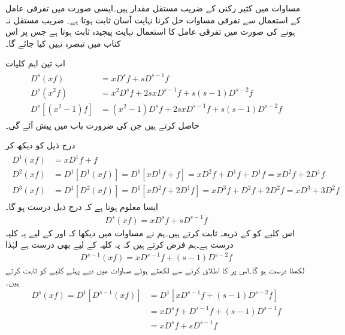 مساوات  میں کثیر رکنی کے  ضریب  مستقل مقدار ہیں۔ایسی صورت میں تفرقی عامل کے استعمال سے تفرقی مساوات حل کرنا نہایت آسان ثابت ہوتا ہے۔ ضریب  مستقل نہ ہونے کی صورت میں تفرقی عامل کا استعمال نہایت پیچیدہ ثابت ہوتا ہے جس پر اس کتاب میں تبصرہ نہیں کیا جائے گا۔


اب تین اہم کلیات
\begin{gather}\label{مساوات_دوسرا_عامل_کلیات}
\begin{aligned}
D^s(xf)&=xD^sf+sD^{s-1}f \\
D^s(x^2f)&=x^2D^s f+2sxD^{s-1}f+s(s-1)D^{s-2}f  \\
D^s[(x^2-1)f]&=(x^2-1)D^sf+2sxD^{s-1}f+s(s-1)D^{s-2}f
\end{aligned}
\end{gather}
حاصل کرتے ہیں جن کی ضرورت باب  میں پیش آئے گی۔

درج ذیل کو دیکھ کر
\begin{gather}\label{مساوات_دوسری_تفرقی_عامل_کلیہ_الف}
\begin{aligned}
D^1(xf)&=xD^1f+f\\
D^2(xf)&=D^1[D^1(xf)]=D^1[xD^1f+f]=xD^2f+D^1f+D^1f=xD^2f+2D^1f\\
D^3(xf)&=D^1[D^2(xf)]=D^1[xD^2f+2D^1f]=xD^3f+D^2f+2D^2f=xD^3+3D^2f
\end{aligned}
\end{gather}
ایسا معلوم ہوتا ہے کہ درج ذیل درست ہو گا۔
\begin{align}
D^s(xf)=xD^sf+sD^{s-1}f
\end{align}
اس کلیے کو  کے ذریعہ ثابت کرتے ہیں۔ہم نے مساوات  میں دیکھا کہ  اور  کے لیے یہ کلیہ درست ہے۔ہم فرض کرتے ہیں کہ یہ کلیہ  کے لیے بھی درست ہے لہٰذا
\begin{align}
D^{s-1}(xf)=xD^{s-1}f+(s-1)D^{s-2}f
\end{align}
لکھنا درست ہو گا۔اس پر  کا اطلاق کرنے سے  لکھتے ہوئے مساوات  میں دیے پہلے کلیے کو ثابت کرتے ہیں۔
\begin{align*}
D^s(xf)=D^1[D^{s-1}(xf)]&=D^1[xD^{s-1}f+(s-1)D^{s-2}f]\\
&=xD^sf+D^{s-1}f+(s-1)D^{s-1}f\\
&=xD^sf+sD^{s-1}f
\end{align*}

